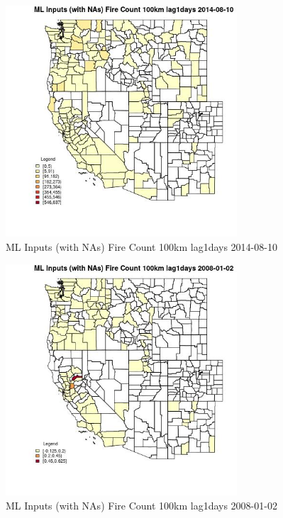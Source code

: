 \begin{figure} 
\centering  
\includegraphics[width=0.77\textwidth]{Code_Outputs/Report_ML_input_PM25_Step4_part_e_de_duplicated_aves_compiled_2019-05-18wNAs_CountyFire_Count_100km_lag1daysMean2014-08-10.jpg} 
\caption{\label{fig:Report_ML_input_PM25_Step4_part_e_de_duplicated_aves_compiled_2019-05-18wNAsCountyFire_Count_100km_lag1daysMean2014-08-10}ML Inputs (with NAs) Fire Count 100km lag1days 2014-08-10} 
\end{figure} 
 

\begin{figure} 
\centering  
\includegraphics[width=0.77\textwidth]{Code_Outputs/Report_ML_input_PM25_Step4_part_e_de_duplicated_aves_compiled_2019-05-18wNAs_CountyFire_Count_100km_lag1daysMean2008-01-02.jpg} 
\caption{\label{fig:Report_ML_input_PM25_Step4_part_e_de_duplicated_aves_compiled_2019-05-18wNAsCountyFire_Count_100km_lag1daysMean2008-01-02}ML Inputs (with NAs) Fire Count 100km lag1days 2008-01-02} 
\end{figure} 
 

